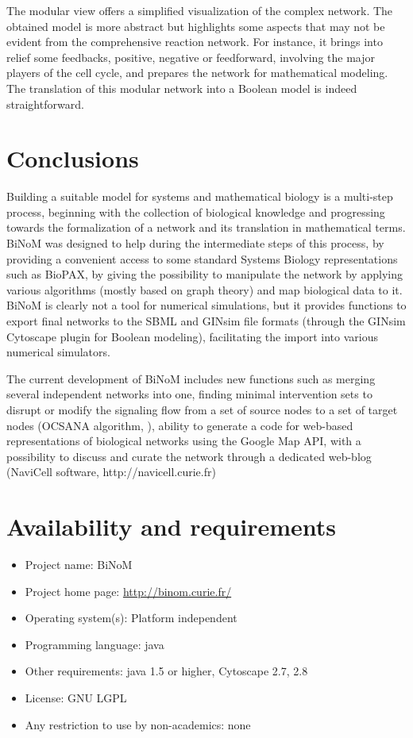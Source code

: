 \documentclass[10pt]{bmc_article}
\newenvironment{bmcformat}{\baselineskip20pt\sloppy\setboolean{publ}{false}}{\baselineskip20pt\sloppy}
\begin{document}
\begin{bmcformat}
The modular view offers a simplified visualization of the complex network. The
obtained model is more abstract but highlights some aspects that may not be
evident from the comprehensive reaction network. For instance, it brings into relief some
feedbacks, positive, negative or feedforward, involving the major players of the
cell cycle, and prepares the network for mathematical modeling. The translation
of this modular network into a Boolean model is indeed straightforward.

\section*{Conclusions}

Building a suitable model for systems and mathematical biology is a multi-step
process, beginning with the collection of biological knowledge and progressing
towards the formalization of a network and its translation in mathematical
terms. BiNoM was designed to help during the intermediate steps of this process,
by providing a convenient access to some standard Systems Biology
representations such as BioPAX, by giving the possibility to manipulate the
network by applying various algorithms (mostly based on graph theory)
and map biological data to it. BiNoM is clearly not a tool for numerical
simulations, but it provides functions to export final networks to the SBML and
GINsim file formats (through the GINsim Cytoscape plugin for Boolean modeling), facilitating the
import into various numerical simulators.

The current development of BiNoM includes new functions such as merging several
independent networks into one, finding minimal intervention sets to disrupt or modify the
signaling flow from a set of source nodes to a set of target nodes (OCSANA algorithm, \cite{Vera-Licona2012OCSANA}), ability to
generate a code for web-based representations of biological networks using the
Google Map API, with a possibility to discuss and curate the network through a dedicated web-blog 
(NaviCell software, http://navicell.curie.fr)


\section*{Availability and requirements}

\begin{itemize}
\item Project name: BiNoM
\item Project home page: \url{http://binom.curie.fr/}
\item Operating system(s): Platform independent
\item Programming language: java
\item Other requirements: java 1.5 or higher, Cytoscape 2.7, 2.8
\item License: GNU LGPL
\item Any restriction to use by non-academics: none
\end{itemize}





\end{bmcformat}
\end{document}

